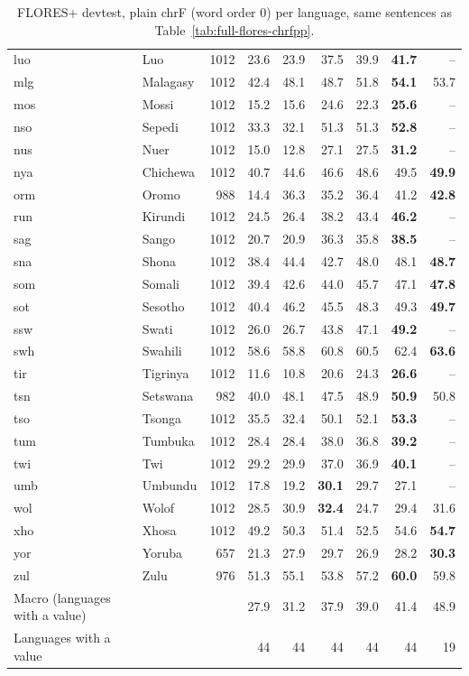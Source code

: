 \begin{table}[t]
\begin{tabular}{@{}llrrrrrrr@{}}
luo & Luo & 1012 & 23.6 & 23.9 & 37.5 & 39.9 & \textbf{41.7} & -- \\
mlg & Malagasy & 1012 & 42.4 & 48.1 & 48.7 & 51.8 & \textbf{54.1} & 53.7 \\
mos & Mossi & 1012 & 15.2 & 15.6 & 24.6 & 22.3 & \textbf{25.6} & -- \\
nso & Sepedi & 1012 & 33.3 & 32.1 & 51.3 & 51.3 & \textbf{52.8} & -- \\
nus & Nuer & 1012 & 15.0 & 12.8 & 27.1 & 27.5 & \textbf{31.2} & -- \\
nya & Chichewa & 1012 & 40.7 & 44.6 & 46.6 & 48.6 & 49.5 & \textbf{49.9} \\
orm & Oromo & 988 & 14.4 & 36.3 & 35.2 & 36.4 & 41.2 & \textbf{42.8} \\
run & Kirundi & 1012 & 24.5 & 26.4 & 38.2 & 43.4 & \textbf{46.2} & -- \\
sag & Sango & 1012 & 20.7 & 20.9 & 36.3 & 35.8 & \textbf{38.5} & -- \\
sna & Shona & 1012 & 38.4 & 44.4 & 42.7 & 48.0 & 48.1 & \textbf{48.7} \\
som & Somali & 1012 & 39.4 & 42.6 & 44.0 & 45.7 & 47.1 & \textbf{47.8} \\
sot & Sesotho & 1012 & 40.4 & 46.2 & 45.5 & 48.3 & 49.3 & \textbf{49.7} \\
ssw & Swati & 1012 & 26.0 & 26.7 & 43.8 & 47.1 & \textbf{49.2} & -- \\
swh & Swahili & 1012 & 58.6 & 58.8 & 60.8 & 60.5 & 62.4 & \textbf{63.6} \\
tir & Tigrinya & 1012 & 11.6 & 10.8 & 20.6 & 24.3 & \textbf{26.6} & -- \\
tsn & Setswana & 982 & 40.0 & 48.1 & 47.5 & 48.9 & \textbf{50.9} & 50.8 \\
tso & Tsonga & 1012 & 35.5 & 32.4 & 50.1 & 52.1 & \textbf{53.3} & -- \\
tum & Tumbuka & 1012 & 28.4 & 28.4 & 38.0 & 36.8 & \textbf{39.2} & -- \\
twi & Twi & 1012 & 29.2 & 29.9 & 37.0 & 36.9 & \textbf{40.1} & -- \\
umb & Umbundu & 1012 & 17.8 & 19.2 & \textbf{30.1} & 29.7 & 27.1 & -- \\
wol & Wolof & 1012 & 28.5 & 30.9 & \textbf{32.4} & 24.7 & 29.4 & 31.6 \\
xho & Xhosa & 1012 & 49.2 & 50.3 & 51.4 & 52.5 & 54.6 & \textbf{54.7} \\
yor & Yoruba & 657 & 21.3 & 27.9 & 29.7 & 26.9 & 28.2 & \textbf{30.3} \\
zul & Zulu & 976 & 51.3 & 55.1 & 53.8 & 57.2 & \textbf{60.0} & 59.8 \\
\midrule
Macro (languages with a value) & & & 27.9 & 31.2 & 37.9 & 39.0 & 41.4 & 48.9 \\
Languages with a value & & & 44 & 44 & 44 & 44 & 44 & 19 \\
\bottomrule
\end{tabular}
\caption{FLORES+ devtest, plain chrF (word order 0) per language, same sentences as Table~\ref{tab:full-flores-chrfpp}.}
\label{tab:full-flores-chrf}
\end{table}
